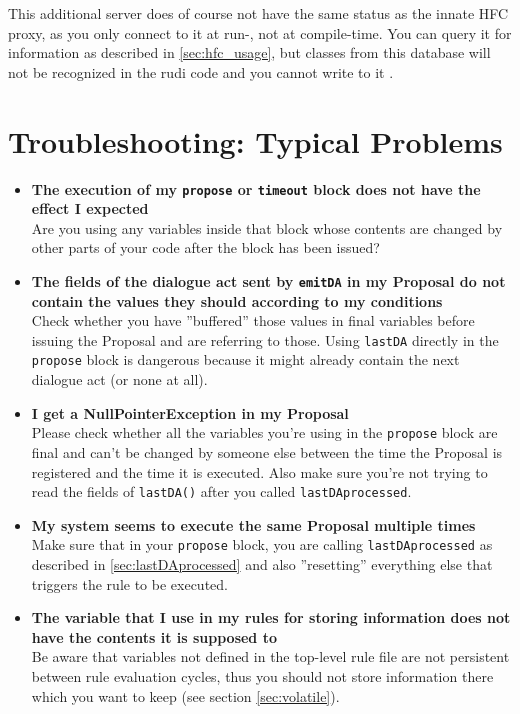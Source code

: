 This additional server does of course not have the same status as the innate HFC proxy, as you only connect to it at run-, not at compile-time. You can query it for information as described in \ref{sec:hfc_usage}, but classes from this database will not be recognized in the rudi code and you cannot write to it .

\section{Troubleshooting: Typical Problems}

\begin{itemize}

	\item \textbf{The execution of my \texttt{propose} or \texttt{timeout} block does not have the effect I expected}\\
	Are you using any variables inside that block whose contents are changed by other parts of your code after the block has been issued?

	\item \textbf{The fields of the dialogue act sent by \texttt{emitDA} in my Proposal do not contain the values they should according to my conditions}\\
	Check whether you have ''buffered'' those values in final variables before issuing the Proposal and are referring to those. Using \texttt{lastDA} directly in the \texttt{propose} block is dangerous because it might already contain the next dialogue act (or none at all).

	\item \textbf{I get a NullPointerException in my Proposal}\\
	Please check whether all the variables you're using in the \texttt{propose} block are final and can't be changed by someone else between the time the Proposal is registered and the time it is executed. Also make sure you're not trying to read the fields of \texttt{lastDA()} after you called \texttt{lastDAprocessed}.

	\item \textbf{My system seems to execute the same Proposal multiple times}\\
	Make sure that in your \texttt{propose} block, you are calling \texttt{lastDAprocessed} as described in \ref{sec:lastDAprocessed} and also ''resetting'' everything else that triggers the rule to be executed.

	\item \textbf{The variable that I use in my rules for storing information does not have the contents it is supposed to}\\
	Be aware that variables not defined in the top-level rule file are not persistent between rule evaluation cycles, thus you should not store information there which you want to keep (see section \ref{sec:volatile}).


\end{itemize}
